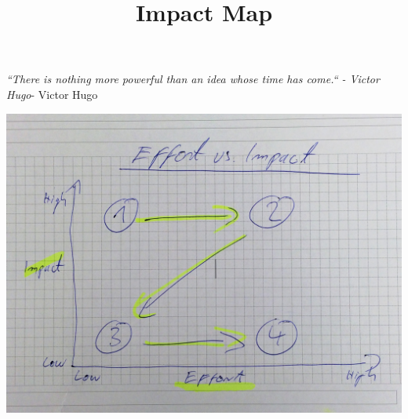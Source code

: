 \documentclass{ximera}
\title{Impact Map}
\begin{document}
\begin{abstract}

\end{abstract}
\maketitle

\newline

\emph{``There is nothing more powerful than an idea whose time has come.`` {\color{grey}- Victor Hugo}}- Victor Hugo

\newline

\begin{image}
\includegraphics{e_vs_i.jpg}
\end{image}
\end{document}
